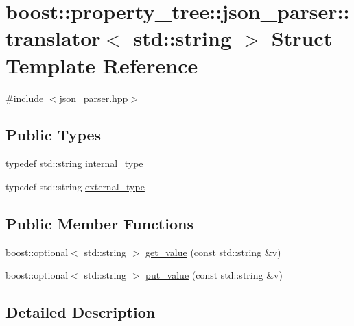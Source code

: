 \hypertarget{structboost_1_1property__tree_1_1json__parser_1_1translator_3_01std_1_1string_01_4}{}\section{boost\+:\+:property\+\_\+tree\+:\+:json\+\_\+parser\+:\+:translator$<$ std\+:\+:string $>$ Struct Template Reference}
\label{structboost_1_1property__tree_1_1json__parser_1_1translator_3_01std_1_1string_01_4}


{\ttfamily \#include $<$json\+\_\+parser.\+hpp$>$}

\subsection*{Public Types}
\begin{DoxyCompactItemize}
\item 
typedef std\+::string \hyperlink{structboost_1_1property__tree_1_1json__parser_1_1translator_3_01std_1_1string_01_4_a0442088549debbf3d26b2506b4bd7aad}{internal\+\_\+type}
\item 
typedef std\+::string \hyperlink{structboost_1_1property__tree_1_1json__parser_1_1translator_3_01std_1_1string_01_4_a31b953272d7ddc4de96930a64e01c25a}{external\+\_\+type}
\end{DoxyCompactItemize}
\subsection*{Public Member Functions}
\begin{DoxyCompactItemize}
\item 
boost\+::optional$<$ std\+::string $>$ \hyperlink{structboost_1_1property__tree_1_1json__parser_1_1translator_3_01std_1_1string_01_4_a156c6497ef493978904665ba508226a8}{get\+\_\+value} (const std\+::string \&v)
\item 
boost\+::optional$<$ std\+::string $>$ \hyperlink{structboost_1_1property__tree_1_1json__parser_1_1translator_3_01std_1_1string_01_4_ae7eee6b74826f7b16599c38be93c0e37}{put\+\_\+value} (const std\+::string \&v)
\end{DoxyCompactItemize}


\subsection{Detailed Description}
